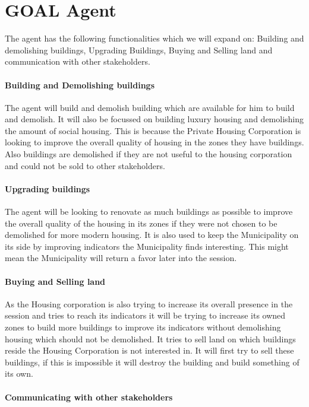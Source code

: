 \section{GOAL Agent}
The agent has the following functionalities which we will expand on: Building and demolishing buildings, Upgrading Buildings, Buying and Selling land and communication with other stakeholders.

\paragraph{Building and Demolishing buildings}
The agent will build and demolish building which are available for him to build and demolish. It will also be focussed on building luxury housing and demolishing the amount of social housing. This is because the Private Housing Corporation is looking to improve the overall quality of housing in the zones they have buildings. Also buildings are demolished if they are not useful to the housing corporation and could not be sold to other stakeholders.

\paragraph{Upgrading buildings}
The agent will be looking to renovate as much buildings as possible to improve the overall quality of the housing in its zones if they were not chosen to be demolished for more modern housing. It is also used to keep the Municipality on its side by improving indicators the Municipality finds interesting. This might mean the Municipality will return a favor later into the session.

\paragraph{Buying and Selling land}
As the Housing corporation is also trying to increase its overall presence in the session and tries to reach its indicators it will be trying to increase its owned zones to build more buildings to improve its indicators without demolishing housing which should not be demolished. It tries to sell land on which buildings reside the Housing Corporation is not interested in. It will first try to sell these buildings, if this is impossible it will destroy the building and build something of its own.

\paragraph{Communicating with other stakeholders}